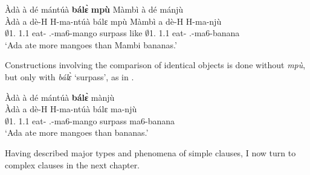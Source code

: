 \ea \label{CC8}
  \glll Àdà à dé mántúà {\bfseries bálɛ̀} {\bfseries mpù} Màmbì à dé mánjù \\
        Àdà a dè-H H-ma-ntúà bálɛ mpù Màmbì a dè-H H-ma-njù \\
       $\emptyset$1.{\PN} 1.{\PST}1 eat-{\R} {\OBJ}.{\LINK}-ma6-mango surpass like $\emptyset$1.{\PN} 1.{\PST}1 eat-{\R} {\OBJ}.{\LINK}-ma6-banana\\
    \trans `Ada ate more mangoes than Mambi bananas.'
\z

Constructions involving the comparison of identical objects is done without {\itshape mpù}, but only with {\itshape bálɛ̀} `surpass', as in .

\ea \label{CC9}
  \glll Àdà à dé mántúà {\bfseries bálɛ̀} mànjù \\
        Àdà a dè-H H-ma-ntúà bálɛ ma-njù \\
       $\emptyset$1.{\PN} 1.{\PST}1 eat-{\R} {\OBJ}.{\LINK}-ma6-mango surpass ma6-banana\\
    \trans `Ada ate more mangoes than bananas.'
\z

\noindent Having described major types and phenomena of simple clauses, I now turn to complex clauses in the next chapter. 








